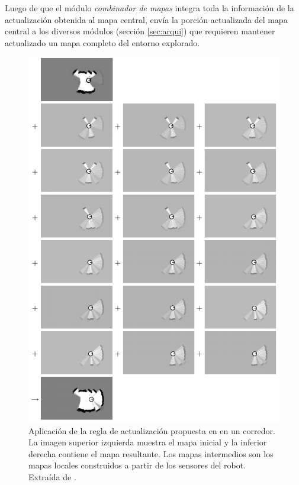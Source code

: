 Luego de que el módulo \emph{combinador de mapas} integra toda la información
de la actualización obtenida al mapa central, envía la porción actualizada del
mapa central a los diversos módulos (sección \ref{sec:arqui}) que requieren
mantener actualizado un mapa completo del entorno explorado.

\begin{figure}[H]
  \center
  \includegraphics[width=0.95\linewidth]{imagenes/occgridUpdate.png}
  \caption[Aplicación de la regla de actualización propuesta en
  \cite{stachniss2009robotic} en un corredor.]{Aplicación de la
    regla de actualización propuesta en \cite{stachniss2009robotic} en un
    corredor. La imagen superior izquierda muestra el mapa inicial y
    la inferior derecha contiene el mapa resultante. Los mapas intermedios son los
    mapas locales construidos a partir de los sensores del robot. Extraída de
  \cite{stachniss2009robotic}. }
  \label{fig:mappingUpRule}
\end{figure} 



